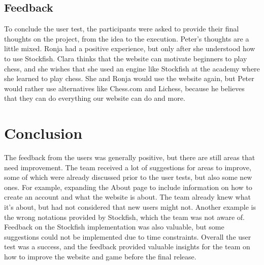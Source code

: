 \subsection{Feedback}\label{subsec:feedback}

To conclude the user test, the participants were asked to provide their final thoughts on the project, from the idea to
the execution.
Peter's thoughts are a little mixed.
Ronja had a positive experience, but only after she understood how to use Stockfish.
Clara thinks that the website can motivate beginners to play chess, and she wishes that she used an engine like Stockfish
at the academy where she learned to play chess.
She and Ronja would use the website again, but Peter would rather use alternatives like Chess.com and Lichess, because
he believes that they can do everything our website can do and more.

\section{Conclusion}\label{sec:tests-conclusion}

The feedback from the users was generally positive, but there are still areas that need improvement.
The team received a lot of suggestions for areas to improve, some of which were already discussed prior to the user
tests, but also some new ones.
For example, expanding the About page to include information on how to create an account and what the website is about.
The team already knew what it's about, but had not considered that new users might not.
Another example is the wrong notations provided by Stockfish, which the team was not aware of.
Feedback on the Stockfish implementation was also valuable, but some suggestions could not be implemented due to time
constraints.
Overall the user test was a success, and the feedback provided valuable insights for the team on how to improve the
website and game before the final release.
